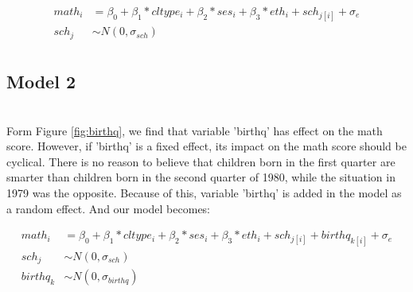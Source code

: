 \documentclass{article}
\begin{document}
\begin{align*}
    math_i &= \beta_0 + \beta_1*cltype_i + \beta_2*ses_i + \beta_3*eth_i + sch_{j[i]} + \sigma_e\\
    sch_j &\sim N(0, \sigma_{sch})\\
\end{align*}

\subsection{Model 2}



\begin{minipage}{\linewidth}
    \label{fig:birthq}
\end{minipage}\\

Form Figure \ref{fig:birthq}, we find that variable 'birthq' has effect on the math score. 
However, if 'birthq' is a fixed effect, its impact on the math score should be cyclical. 
There is no reason to believe that children born in the first quarter are smarter than children born in the second quarter of 1980, 
while the situation in 1979 was the opposite. 
Because of this, variable 'birthq' is added in the model as a random effect. And our model becomes:

\begin{align*}
    math_i &= \beta_0 + \beta_1*cltype_i + \beta_2*ses_i + \beta_3*eth_i + sch_{j[i]} + birthq_{k[i]} + \sigma_e\\
    sch_j &\sim N(0, \sigma_{sch})\\
    birthq_k &\sim N(0, \sigma_{birthq})\\
\end{align*}
\end{document}
